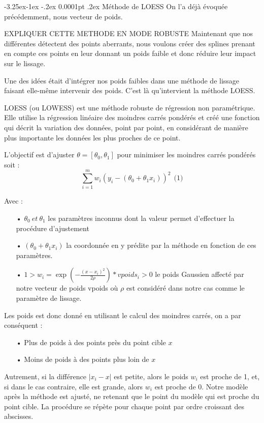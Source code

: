 \documentclass[a4paper,12pt]{article} %
\makeatletter
\renewcommand\paragraph{\@startsection{paragraph}{4}{\z@}%
                                      {-3.25ex\@plus -1ex \@minus -.2ex}%
                                      {0.0001pt \@plus .2ex}%
                                      {\normalfont\normalsize\bfseries}}
\makeatother
\begin{document}
                    
			    \paragraph{Méthode de LOESS}
			        On l'a déjà évoquée précédemment, nous  vecteur de poids. 
			        
			        EXPLIQUER CETTE METHODE EN MODE ROBUSTE
			        Maintenant que nos différentes détectent des points aberrants, nous voulons créer des splines prenant en compte ces points en leur donnant un poids faible et donc réduire leur impact sur le lissage.
                    
                    Une des idées était d'intégrer nos poids faibles dans une méthode de lissage faisant elle-même intervenir des poids. C'est là qu'intervient la méthode LOESS.
                    
                    LOESS (ou LOWESS) est une méthode robuste de régression non paramétrique. Elle utilise la régression linéaire des moindres carrés pondérés et créé une fonction qui décrit la variation des données, point par point, en considérant de manière plus importante les données les plus proches de ce point.
                    
                    L'objectif est d'ajuster $\theta = [\theta_0, \theta_1]$ pour minimiser les moindres carrés pondérés soit : \[\sum_{i=1}^m w_i ( y_i - (\theta_0 + \theta_1 x_i))^2 \ \ \text{(1)}\]
                    
                    Avec : 
                    \begin{itemize}
                        \item[•]  $\theta_0 \ et \ \theta_1$ les paramètres inconnus dont la valeur permet d'effectuer la procédure d'ajustement  
                        \item[•]  $(\theta_0 + \theta_1 x_i)$ la coordonnée en y prédite par la méthode en fonction de ces paramètres.
                        \item[•]  $1 > w_i = \exp \left( - \frac{(x -x_i)^2}{2 \rho} \right)*vpoids_i > 0$ le poids Gaussien affecté par notre vecteur de poids vpoids où  $\rho$ est considéré dans notre cas comme le paramètre de lissage.
                    \end{itemize}
                    
                    Les poids est donc donné en utilisant le calcul des moindres carrés, on a par conséquent :
                    \begin{itemize}
                        \item[•] Plus de poids à des points près du point cible $x$ 
                        \item[•] Moins de poids à des points plus loin de $x$
                    \end{itemize}
                    Autrement, si la différence $| x_i - x |$ est petite, alors le poids $w_i$ est proche de 1, et, si dans le cas contraire, elle est grande, alors $w_i$ est proche de 0. 
                    Notre modèle après la méthode est ajusté, ne retenant que le point du modèle qui est proche du point cible. La procédure se répète pour chaque point par ordre croissant des abscisses.
                    
\end{document}

